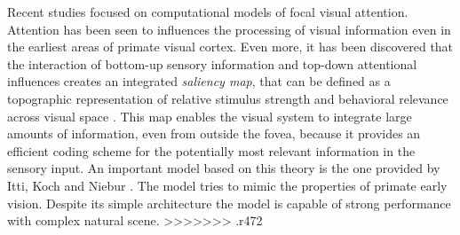 Recent studies focused on computational models of focal visual attention. Attention has been seen to influences the processing of visual information even in the earliest areas of primate visual cortex. Even more, it has been discovered that the interaction of bottom-up sensory information and top-down attentional influences creates an integrated \textit{saliency map}, that can be defined as a topographic representation of relative stimulus strength and behavioral relevance across visual space \cite{Saliency_WWHW}. This map enables the visual system to integrate large amounts of information, even from outside the fovea, because it provides an efficient coding scheme for the potentially most relevant information in the sensory input.
An important model based on this theory is the one provided by Itti, Koch and Niebur \cite{Itti_review, Itti_model}. The model tries to mimic the properties of primate early vision. Despite its simple architecture the model is capable of strong performance with complex natural scene. >>>>>>> .r472
